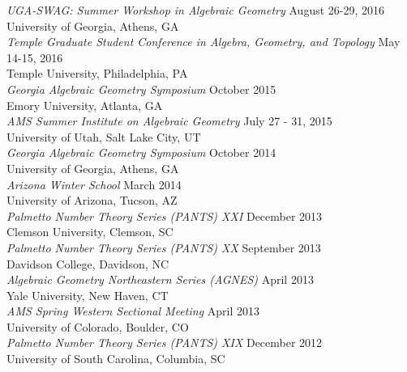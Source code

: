 \documentclass{article}
\begin{document}
  \noindent\textsl{UGA-SWAG: Summer Workshop in Algebraic Geometry} \hfill August 26-29, 2016\\
  University of Georgia, Athens, GA\\
  
  \noindent\textsl{Temple Graduate Student Conference in Algebra, Geometry, and Topology} \hfill May 14-15, 2016\\
  Temple University, Philadelphia, PA\\
  
  \noindent\textsl{Georgia Algebraic Geometry Symposium} \hfill October 2015\\
  Emory University, Atlanta, GA\\

  \noindent\textsl{AMS Summer Institute on Algebraic Geometry} \hfill July 27 - 31, 2015\\
  University of Utah, Salt Lake City, UT\\

  \noindent\textsl{Georgia Algebraic Geometry Symposium} \hfill October 2014\\
  University of Georgia, Athens, GA\\

  \noindent\textsl{Arizona Winter School} \hfill March 2014\\
  University of Arizona, Tucson, AZ\\

  \noindent\textsl{Palmetto Number Theory Series (PANTS) XXI} \hfill December 2013\\
  Clemson University, Clemson, SC\\

  \noindent\textsl{Palmetto Number Theory Series (PANTS) XX} \hfill September 2013\\
  Davidson College, Davidson, NC\\
  
  \noindent\textsl{Algebraic Geometry Northeastern Series (AGNES)} \hfill April 2013\\
  Yale University, New Haven, CT\\

  \noindent\textsl{AMS Spring Western Sectional Meeting} \hfill April 2013\\
  University of Colorado, Boulder, CO\\

  \noindent\textsl{Palmetto Number Theory Series (PANTS) XIX} \hfill December 2012\\
  University of South Carolina, Columbia, SC\\
\end{document}
